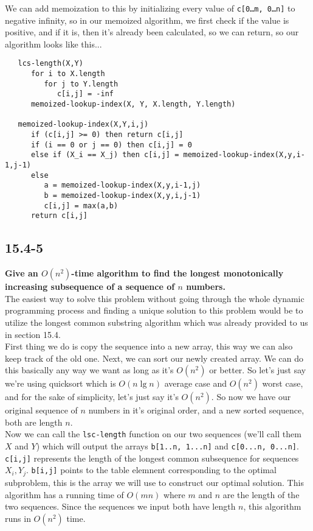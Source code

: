 \documentclass[11pt]{article}
\begin{document}
 We can add memoization to this by initializing every value of \texttt{c[0\dots m, 0\dots n]} 
 to negative infinity, so in our memoized algorithm, we first check if the value is positive, 
 and if it is, then it's already been calculated, so we can return, so our algorithm looks like 
 this... \\

 \begin{verbatim}
   lcs-length(X,Y)
      for i to X.length
         for j to Y.length 
            c[i,j] = -inf
      memoized-lookup-index(X, Y, X.length, Y.length)

   memoized-lookup-index(X,Y,i,j)
      if (c[i,j] >= 0) then return c[i,j]
      if (i == 0 or j == 0) then c[i,j] = 0
      else if (X_i == X_j) then c[i,j] = memoized-lookup-index(X,y,i-1,j-1)
      else
         a = memoized-lookup-index(X,y,i-1,j)
         b = memoized-lookup-index(X,y,i,j-1)
         c[i,j] = max(a,b)
      return c[i,j]
 \end{verbatim}
 \newpage

 \subsection*{15.4-5}
 \textbf{Give an $O(n^2)$-time algorithm to find the longest monotonically increasing 
 subsequence of a sequence of $n$ numbers.} \\

 The easiest way to solve this problem without going through the whole dynamic programming 
 process and finding a unique solution to this problem would be to utilize the longest 
 common substring algorithm which was already provided to us in section 15.4. \\

 First thing we do is copy the sequence into a new array, this way we can also keep track 
 of the old one.  Next, we can sort our newly created array.  We can do this basically any 
 way we want as long as it's $O(n^2)$ or better.  So let's just say we're using quicksort 
 which is $O(n\lg n)$ average case and $O(n^2)$ worst case, and for the sake of simplicity, 
 let's just say it's $O(n^2)$.  So now we have our original sequence of $n$ numbers in it's 
 original order, and a new sorted sequence, both are length $n$. \\

 Now we can call the \texttt{lsc-length} function on our two sequences (we'll call them $X$ 
 and $Y$) which will output the arrays \texttt{b[1..n, 1...n]} and \texttt{c[0...n, 0...n]}. 
 \texttt{c[i,j]} represents the length of the longest common subsequence for sequences
 $X_i, Y_j$.  \texttt{b[i,j]} points to the table elemnent corresponding to the optimal 
 subproblem, this is the array we will use to construct our optimal solution.  This algorithm 
 has a running time of $O(mn)$ where $m$ and $n$ are the length of the two sequences.  Since 
 the sequences we input both have length $n$, this algorithm runs in $O(n^2)$ time. \\
\end{document}
